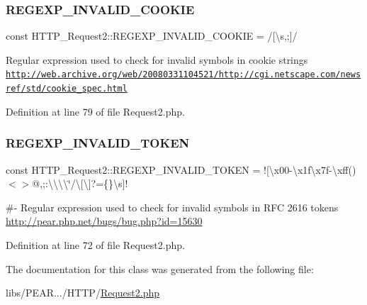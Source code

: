 \subsubsection{\texorpdfstring{R\+E\+G\+E\+X\+P\+\_\+\+I\+N\+V\+A\+L\+I\+D\+\_\+\+C\+O\+O\+K\+IE}{REGEXP\_INVALID\_COOKIE}}
{\footnotesize\ttfamily const H\+T\+T\+P\+\_\+\+Request2\+::\+R\+E\+G\+E\+X\+P\+\_\+\+I\+N\+V\+A\+L\+I\+D\+\_\+\+C\+O\+O\+K\+IE = \textquotesingle{}/\mbox{[}\textbackslash{}s,;\mbox{]}/\textquotesingle{}}

Regular expression used to check for invalid symbols in cookie strings \hyperlink{}{\href{http://web.archive.org/web/20080331104521/http://cgi.netscape.com/newsref/std/cookie_spec.html}{\tt http\+://web.\+archive.\+org/web/20080331104521/http\+://cgi.\+netscape.\+com/newsref/std/cookie\+\_\+spec.\+html} }

Definition at line 79 of file Request2.\+php.

\hypertarget{classHTTP__Request2_a73691a6fc7003599b47be20a8c728bbf}{}\label{classHTTP__Request2_a73691a6fc7003599b47be20a8c728bbf} 
\subsubsection{\texorpdfstring{R\+E\+G\+E\+X\+P\+\_\+\+I\+N\+V\+A\+L\+I\+D\+\_\+\+T\+O\+K\+EN}{REGEXP\_INVALID\_TOKEN}}
{\footnotesize\ttfamily const H\+T\+T\+P\+\_\+\+Request2\+::\+R\+E\+G\+E\+X\+P\+\_\+\+I\+N\+V\+A\+L\+I\+D\+\_\+\+T\+O\+K\+EN = \textquotesingle{}!\mbox{[}\textbackslash{}x00-\/\textbackslash{}x1f\textbackslash{}x7f-\/\textbackslash{}xff()$<$$>$@,;\+:\textbackslash{}\textbackslash{}\textbackslash{}\textbackslash{}\char`\"{}/\textbackslash{}\mbox{[}\textbackslash{}\mbox{]}?=\{\}\textbackslash{}s\mbox{]}!\textquotesingle{}}

\#-\/ Regular expression used to check for invalid symbols in R\+FC 2616 tokens \hyperlink{}{http\+://pear.\+php.\+net/bugs/bug.\+php?id=15630}

Definition at line 72 of file Request2.\+php.



The documentation for this class was generated from the following file\+:\begin{DoxyCompactItemize}
\item 
libs/\+P\+E\+A\+R.../\+H\+T\+T\+P/\hyperlink{Request2_8php}{Request2.\+php}\end{DoxyCompactItemize}
